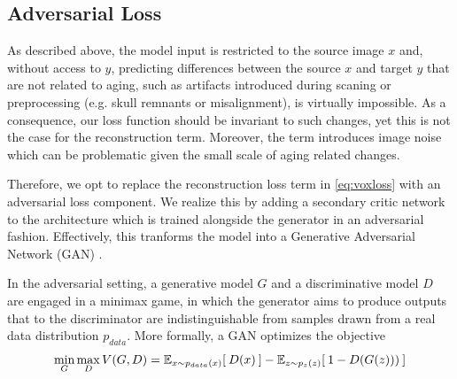 \subsection{Adversarial Loss}

As described above, the model input is restricted to the source image $x$ and, without access to $y$, predicting differences between the source $x$ and target $y$ that are not related to aging, such as artifacts introduced during scaning or preprocessing (e.g. skull remnants or misalignment), is virtually impossible. As a consequence, our loss function should be invariant to such changes, yet this is not the case for the reconstruction term. Moreover, the term introduces image noise which can be problematic given the small scale of aging related changes.


Therefore, we opt to replace the reconstruction loss term in \autoref{eq:voxloss} with an adversarial loss component. We realize this by adding a secondary critic network to the architecture which is trained alongside the generator in an adversarial fashion. Effectively, this tranforms the model into a Generative Adversarial Network (GAN) \cite{GAN}.

In the adversarial setting, a generative model $G$ and a discriminative model $D$ are engaged in a minimax game, in which the generator aims to produce outputs that to the discriminator are indistinguishable from samples drawn from a real data distribution $p_{data}$. More formally, a GAN optimizes the objective
\begin{equation}
	\min_G \max_D V(G, D) = \mathbb{E}_{ x \sim p_{data}(x) } [ \: D (x) \: ] 
	 - \mathbb{E}_{ z \sim p_z(z) } [ \: 1 - D (G(z))) \: ]
\end{equation}

